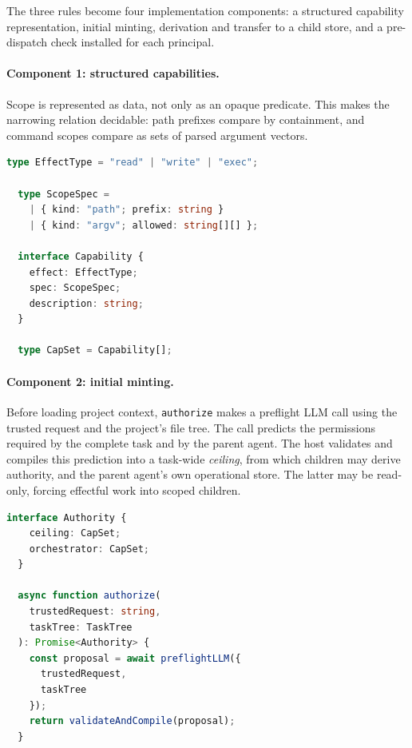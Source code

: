 \documentclass[sigplan,review,anonymous]{acmart}
\begin{document}
  The three rules become four implementation components: a structured
  capability representation, initial minting, derivation and transfer to a
  child store, and a pre-dispatch check installed for each principal.

  \paragraph{Component 1: structured capabilities.}
  Scope is represented as data, not only as an opaque predicate. This makes
  the narrowing relation decidable: path prefixes compare by containment, and
  command scopes compare as sets of parsed argument vectors.
  
  \begin{lstlisting}[language=TypeScript,style=tsstyle,caption={The
    structured capability type.}]
  type EffectType = "read" | "write" | "exec";

  type ScopeSpec =
    | { kind: "path"; prefix: string }
    | { kind: "argv"; allowed: string[][] };
  
  interface Capability {
    effect: EffectType;
    spec: ScopeSpec;
    description: string;
  }

  type CapSet = Capability[];
  \end{lstlisting}
  
  \paragraph{Component 2: initial minting.}
  Before loading project context, \texttt{authorize} makes a preflight LLM
  call using the trusted request and the project's file tree. The call predicts the
  permissions required by the complete task and by the parent agent. The host
  validates and compiles this prediction into a task-wide \emph{ceiling}, from
  which children may derive authority, and the parent agent's own operational
  store. The latter may be read-only, forcing effectful work into scoped
  children.
  
  \begin{lstlisting}[language=TypeScript,style=tsstyle,caption={The
    initial authorization step.}]
  interface Authority {
    ceiling: CapSet;
    orchestrator: CapSet;
  }

  async function authorize(
    trustedRequest: string,
    taskTree: TaskTree
  ): Promise<Authority> {
    const proposal = await preflightLLM({
      trustedRequest,
      taskTree
    });
    return validateAndCompile(proposal);
  }
  \end{lstlisting}
  
\end{document}
